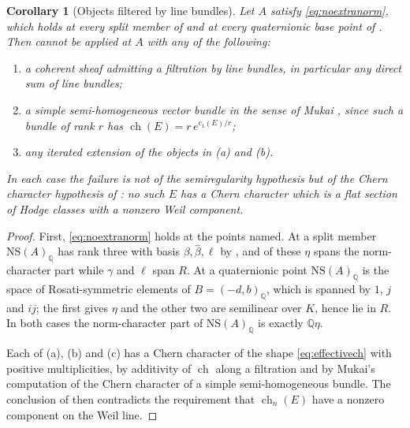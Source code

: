 \documentclass[11pt,reqno]{amsart}
\theoremstyle{plain}
\newtheorem{corollary}[theorem]{Corollary}
\theoremstyle{definition}
\theoremstyle{remark}
\newcommand{\QQ}{\mathbb{Q}}
\newcommand{\NS}{\mathrm{NS}}
\DeclareMathOperator{\ch}{ch}
\begin{document}
\begin{corollary}[Objects filtered by line bundles]\label{cor:nofiltered}
Let $A$ satisfy \eqref{eq:noextranorm}, which holds at every split member of
\cite[Theorem~15.2]{paperI} and at every quaternionic base point of
\cite[Theorem~15.25]{paperI}. Then  cannot be applied at $A$
with any of the following:
\begin{enumerate}[label=\textup{(\alph*)},nosep]
\item a coherent sheaf admitting a filtration by line bundles, in particular
  any direct sum of line bundles;
\item a simple semi-homogeneous vector bundle in the sense of Mukai
  \cite{Muk78}, since such a bundle of rank $r$ has $\ch(E)=r\,e^{c_{1}(E)/r}$;
\item any iterated extension of the objects in (a) and (b).
\end{enumerate}
In each case the failure is not of the semiregularity hypothesis but of the
Chern character hypothesis of : no such $E$ has a Chern
character which is a flat section of Hodge classes with a nonzero Weil
component.
\end{corollary}

\begin{proof}
First, \eqref{eq:noextranorm} holds at the points named. At a split member
$\NS(A)_{\QQ}$ has rank three with basis $\beta,\widehat\beta,\ell$ by
\cite[Proposition~15.19(iv)]{paperI}, and of these $\eta$ spans the norm-character part
while $\gamma$ and $\ell$ span $R$. At a quaternionic point $\NS(A)_{\QQ}$ is
the space of Rosati-symmetric elements of $B=(-d,b)_{\QQ}$, which is spanned
by $1$, $j$ and $ij$; the first gives $\eta$ and the other two are semilinear
over $K$, hence lie in $R$. In both cases the norm-character part of
$\NS(A)_{\QQ}$ is exactly $\QQ\eta$.

Each of (a), (b) and (c) has a Chern character of the shape
\eqref{eq:effectivech} with positive multiplicities, by additivity of $\ch$
along a filtration and by Mukai's computation of the Chern character of a
simple semi-homogeneous bundle. The conclusion of  then
contradicts the requirement that $\ch_{n}(E)$ have a nonzero component on the
Weil line.
\end{proof}
\end{document}
